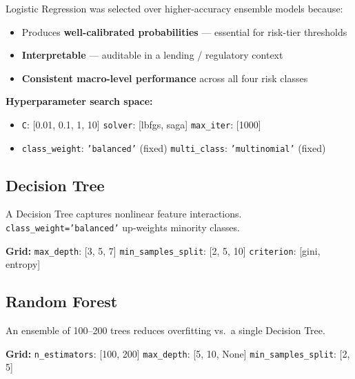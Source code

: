 \documentclass[12pt,a4paper]{article}
\begin{document}
\begin{tcolorbox}[
  enhanced, colback=successbg, colframe=success, arc=5pt,
  title={\faRocket\quad Selected as Production Model},
  fonttitle=\bfseries\small\color{white},
  attach boxed title to top left={yshift=-2mm, xshift=4mm},
  boxed title style={colback=success},
  left=6pt, right=6pt, top=10pt, bottom=6pt,
]
  Logistic Regression was selected over higher-accuracy ensemble models because:
  \begin{itemize}
    \item[\faCheck] Produces \textbf{well-calibrated probabilities}
          --- essential for risk-tier thresholds
    \item[\faCheck] \textbf{Interpretable} --- auditable in a
          lending / regulatory context
    \item[\faCheck] \textbf{Consistent macro-level performance}
          across all four risk classes
  \end{itemize}
\end{tcolorbox}

\textbf{Hyperparameter search space:}
\begin{itemize}
  \item \texttt{C}: [0.01, 0.1, 1, 10] \quad
        \texttt{solver}: [lbfgs, saga] \quad
        \texttt{max\_iter}: [1000]
  \item \texttt{class\_weight}: \texttt{'balanced'} (fixed) \quad
        \texttt{multi\_class}: \texttt{'multinomial'} (fixed)
\end{itemize}

\subsection{Decision Tree}

A Decision Tree captures nonlinear feature interactions.
\texttt{class\_weight='balanced'} up-weights minority classes.

\textbf{Grid:} \texttt{max\_depth}: [3, 5, 7] \quad
\texttt{min\_samples\_split}: [2, 5, 10] \quad
\texttt{criterion}: [gini, entropy]

\subsection{Random Forest}

An ensemble of 100--200 trees reduces overfitting vs.\ a single Decision Tree.

\textbf{Grid:} \texttt{n\_estimators}: [100, 200] \quad
\texttt{max\_depth}: [5, 10, None] \quad
\texttt{min\_samples\_split}: [2, 5]
\end{document}
